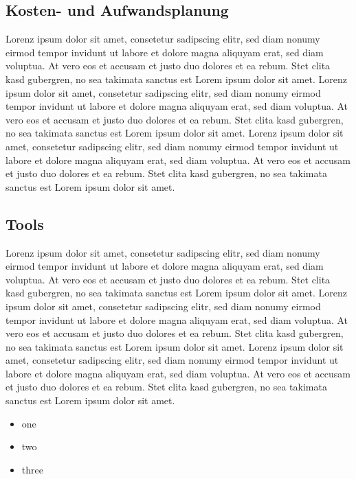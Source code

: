 \subsection{Kosten- und Aufwandsplanung}\label{subsec:Kosten-Aufwandsplanung}
Lorenz ipsum dolor sit amet, consetetur sadipscing elitr, sed diam nonumy eirmod tempor invidunt ut labore et dolore magna aliquyam erat, sed diam voluptua.
At vero eos et accusam et justo duo dolores et ea rebum.
Stet clita kasd gubergren, no sea takimata sanctus est Lorem ipsum dolor sit amet.
Lorenz ipsum dolor sit amet, consetetur sadipscing elitr, sed diam nonumy eirmod tempor invidunt ut labore et dolore magna aliquyam erat, sed diam voluptua.
At vero eos et accusam et justo duo dolores et ea rebum.
Stet clita kasd gubergren, no sea takimata sanctus est Lorem ipsum dolor sit amet.
Lorenz ipsum dolor sit amet, consetetur sadipscing elitr, sed diam nonumy eirmod tempor invidunt ut labore et dolore magna aliquyam erat, sed diam voluptua.
At vero eos et accusam et justo duo dolores et ea rebum.
Stet clita kasd gubergren, no sea takimata sanctus est Lorem ipsum dolor sit amet.

\subsection{Tools}\label{subsec:Tools}
Lorenz ipsum dolor sit amet, consetetur sadipscing elitr, sed diam nonumy eirmod tempor invidunt ut labore et dolore magna aliquyam erat, sed diam voluptua.
At vero eos et accusam et justo duo dolores et ea rebum.
Stet clita kasd gubergren, no sea takimata sanctus est Lorem ipsum dolor sit amet.
Lorenz ipsum dolor sit amet, consetetur sadipscing elitr, sed diam nonumy eirmod tempor invidunt ut labore et dolore magna aliquyam erat, sed diam voluptua.
At vero eos et accusam et justo duo dolores et ea rebum.
Stet clita kasd gubergren, no sea takimata sanctus est Lorem ipsum dolor sit amet.
Lorenz ipsum dolor sit amet, consetetur sadipscing elitr, sed diam nonumy eirmod tempor invidunt ut labore et dolore magna aliquyam erat, sed diam voluptua.
At vero eos et accusam et justo duo dolores et ea rebum.
Stet clita kasd gubergren, no sea takimata sanctus est Lorem ipsum dolor sit amet.

\begin{itemize}
    \item one
    \item two
    \item three
\end{itemize}
